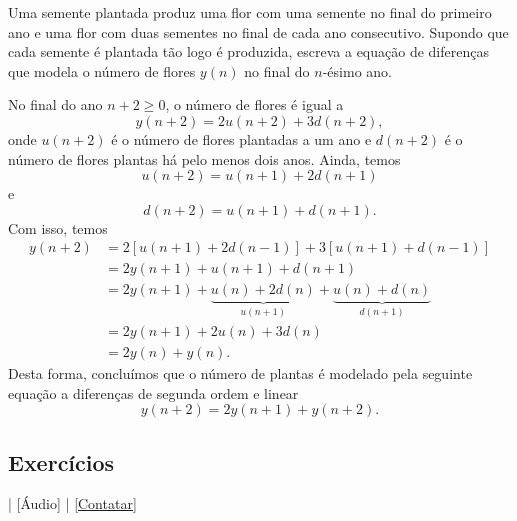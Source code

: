 \begin{exeresol}
  Uma semente plantada produz uma flor com uma semente no final do primeiro ano e uma flor com duas sementes no final de cada ano consecutivo. Supondo que cada semente é plantada tão logo é produzida, escreva a equação de diferenças que modela o número de flores $y(n)$ no final do $n$-ésimo ano.
\end{exeresol}
\begin{resol}
  No final do ano $n+2\geq 0$, o número de flores é igual a
  \begin{equation}
    y(n+2) = 2u(n+2) + 3d(n+2),
  \end{equation}
  onde $u(n+2)$ é o número de flores plantadas a um ano e $d(n+2)$ é o número de flores plantas há pelo menos dois anos. Ainda, temos
  \begin{equation}
    u(n+2) = u(n+1) + 2d(n+1)
  \end{equation}
  e
  \begin{equation}
    d(n+2) = u(n+1) + d(n+1).
  \end{equation}
  Com isso, temos
  \begin{align}
    y(n+2) &= 2\left[u(n+1)+2d(n-1)\right] + 3\left[u(n+1)+d(n-1)\right] \\
    &= 2y(n+1) + u(n+1) + d(n+1) \\
    &= 2y(n+1) + \underbrace{u(n) + 2d(n)}_{u(n+1)} + \underbrace{u(n) + d(n)}_{d(n+1)} \\
    &= 2y(n+1) + 2u(n) + 3d(n) \\
    &= 2y(n) + y(n).
  \end{align}
  Desta forma, concluímos que o número de plantas é modelado pela seguinte equação a diferenças de segunda ordem e linear
  \begin{equation}
    y(n+2) = 2y(n+1) + y(n+2).
  \end{equation}
\end{resol}

\subsection*{Exercícios}

\begin{flushright}
  [Vídeo] | [Áudio] | \href{https://phkonzen.github.io/notas/contato.html}{[Contatar]}
\end{flushright}

